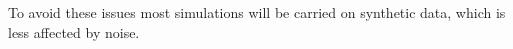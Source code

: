 To avoid these issues most simulations will be carried on synthetic data, which is less affected by noise.


%
%
%
%
%
%


